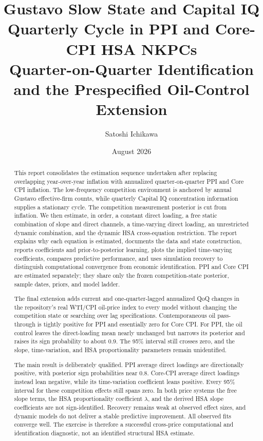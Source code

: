 \documentclass[11pt]{article}
\title{\textbf{Gustavo Slow State and Capital IQ Quarterly Cycle in PPI and Core-CPI HSA NKPCs}\\[3pt]
\large Quarter-on-Quarter Identification and the Prespecified Oil-Control Extension}
\author{Satoshi Ichikawa}
\date{August 2026}
\begin{document}
\maketitle

\begin{abstract}
This report consolidates the estimation sequence undertaken after replacing overlapping
year-over-year inflation with annualized quarter-on-quarter PPI and Core CPI inflation.
The low-frequency competition environment is anchored by annual Gustavo effective-firm
counts, while quarterly Capital IQ concentration information supplies a stationary cycle.
The competition measurement posterior is cut from inflation. We then estimate, in order,
a constant direct loading, a free static combination of slope and direct channels, a
time-varying direct loading, an unrestricted dynamic combination, and the dynamic HSA
cross-equation restriction. The report explains why each equation is estimated, documents
the data and state construction, reports coefficients and prior-to-posterior learning,
plots the implied time-varying coefficients, compares predictive performance, and uses
simulation recovery to distinguish computational convergence from economic identification.
PPI and Core CPI are estimated separately; they share only the frozen competition-state
posterior, sample dates, priors, and model ladder.

The final extension adds current and one-quarter-lagged annualized QoQ changes in the
repository's real WTI/CPI oil-price index to every model without changing the competition
state or searching over lag specifications. Contemporaneous oil pass-through is tightly
positive for PPI and essentially zero for Core CPI. For PPI, the oil control leaves the
direct-loading mean nearly unchanged but narrows its posterior and raises its sign
probability to about 0.9. The 95\% interval still crosses zero, and the slope, time-variation,
and HSA proportionality parameters remain unidentified.

The main result is deliberately qualified. PPI average direct loadings are directionally
positive, with posterior sign probabilities near 0.8. Core-CPI average direct loadings instead
lean negative, while its time-variation coefficient leans positive. Every 95\% interval for
these competition effects still spans zero. In both price systems the free slope terms, the
HSA proportionality coefficient $\lambda$, and the derived HSA slope coefficients are not
sign-identified. Recovery remains weak at observed effect sizes, and dynamic models do not
deliver a stable predictive improvement. All observed fits converge well. The exercise is
therefore a successful cross-price computational and identification diagnostic, not an
identified structural HSA estimate.
\end{abstract}
\end{document}
